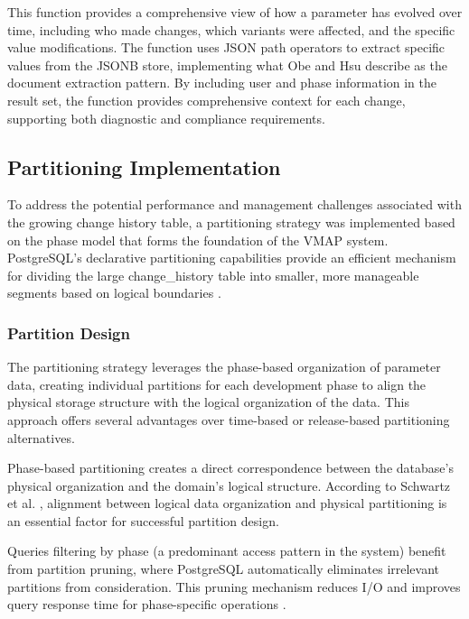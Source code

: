 This function provides a comprehensive view of how a parameter has evolved over time, including who made changes, which variants were affected, and the specific value modifications. The function uses JSON path operators to extract specific values from the JSONB store, implementing what Obe and Hsu \cite{obe2017postgresql} describe as the document extraction pattern. By including user and phase information in the result set, the function provides comprehensive context for each change, supporting both diagnostic and compliance requirements.

\subsection{Partitioning Implementation}
\label{subsec:partitioning-implementation}

To address the potential performance and management challenges associated with the growing change history table, a partitioning strategy was implemented based on the phase model that forms the foundation of the \ac{VMAP} system. PostgreSQL's declarative partitioning capabilities provide an efficient mechanism for dividing the large change\_history table into smaller, more manageable segments based on logical boundaries \cite{obe2017postgresql}.

\subsubsection{Partition Design}
\label{subsubsec:partition-design}

The partitioning strategy leverages the phase-based organization of parameter data, creating individual partitions for each development phase to align the physical storage structure with the logical organization of the data. This approach offers several advantages over time-based or release-based partitioning alternatives.

Phase-based partitioning creates a direct correspondence between the database's physical organization and the domain's logical structure. According to Schwartz et al. \cite{schwartz2012high}, alignment between logical data organization and physical partitioning is an essential factor for successful partition design.

Queries filtering by phase (a predominant access pattern in the system) benefit from partition pruning, where PostgreSQL automatically eliminates irrelevant partitions from consideration. This pruning mechanism reduces I/O and improves query response time for phase-specific operations \cite{obe2017postgresql}.

